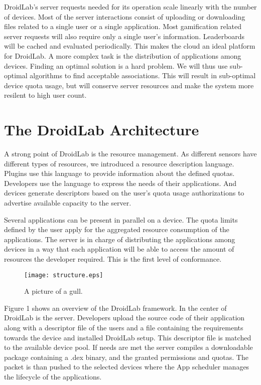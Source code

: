 \documentclass[conference,letterpaper]{IEEEtran}
\begin{document}
DroidLab's server requests needed for its operation scale linearly with the number of devices. Most of the server interactions consist of uploading or downloading files related to a single user or a single application. Most gamification related server requests will also require only a single user's information. Leaderboards will be cached and evaluated periodically. This makes the cloud an ideal platform for DroidLab. A more complex task is the distribution of applications among devices. Finding an optimal solution is a hard problem. We will thus use sub-optimal algorithms to find acceptable associations. This will result in sub-optimal device quota usage, but will conserve server resources and make the system more resilent to high user count.

\section{The DroidLab Architecture}

A strong point of DroidLab is the resource management. As different sensors have different types of resources, we introduced a resource description language. Plugins use this language to provide information about the defined quotas. Developers use the language to express the needs of their applications. And devices generate descriptors based on the user's quota usage authorizations to advertise available capacity to the server.

Several applications can be present in parallel on a device. The quota limits defined by the user apply for the aggregated resource consumption of the applications. The server is in charge of distributing the applications among devices in a way that each application will be able to access the amount of resources the developer required. This is the first level of conformance.

\begin{figure}[h]
\caption{A picture of a gull.}
\centering
	\texttt{[image: structure.eps]}
\end{figure}

Figure 1 shows an overview of the DroidLab framework. In the center of DroidLab is the server. Developers upload the source code of their application along with a descriptor file of the users and a file containing the requirements towards the device and installed DroidLab setup. This descriptor file is matched to the available device pool. If needs are met the server compiles a downloadable package containing a .dex binary, and the granted permissions and quotas. The packet is than pushed to the selected devices where the App scheduler manages the lifecycle of the applications.
\end{document}
